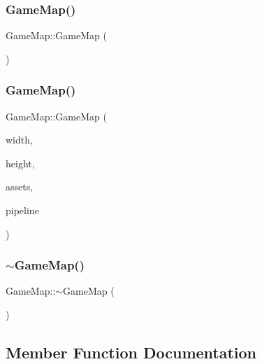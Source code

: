 \subsubsection{\texorpdfstring{Game\+Map()}{GameMap()}\hspace{0.1cm}{\footnotesize\ttfamily [1/2]}}
{\footnotesize\ttfamily Game\+Map\+::\+Game\+Map (\begin{DoxyParamCaption}{ }\end{DoxyParamCaption})}

\mbox{\label{class_game_map_a4b0e78c26fc61ce3e8db947f37828a02}} 
\subsubsection{\texorpdfstring{Game\+Map()}{GameMap()}\hspace{0.1cm}{\footnotesize\ttfamily [2/2]}}
{\footnotesize\ttfamily Game\+Map\+::\+Game\+Map (\begin{DoxyParamCaption}\item[{uint16\+\_\+t}]{width,  }\item[{uint16\+\_\+t}]{height,  }\item[{\hyperlink{class_asset_manager}{Asset\+Manager} $\ast$}]{assets,  }\item[{\hyperlink{class_pipeline}{Pipeline} $\ast$}]{pipeline }\end{DoxyParamCaption})}

\mbox{\label{class_game_map_a85d51ef20c2d27f11c739ff02d5717c3}} 
\subsubsection{\texorpdfstring{$\sim$\+Game\+Map()}{~GameMap()}}
{\footnotesize\ttfamily Game\+Map\+::$\sim$\+Game\+Map (\begin{DoxyParamCaption}{ }\end{DoxyParamCaption})}



\subsection{Member Function Documentation}
\mbox{\label{class_game_map_a9247f8700b645bc62c574811cce82bf7}} 

